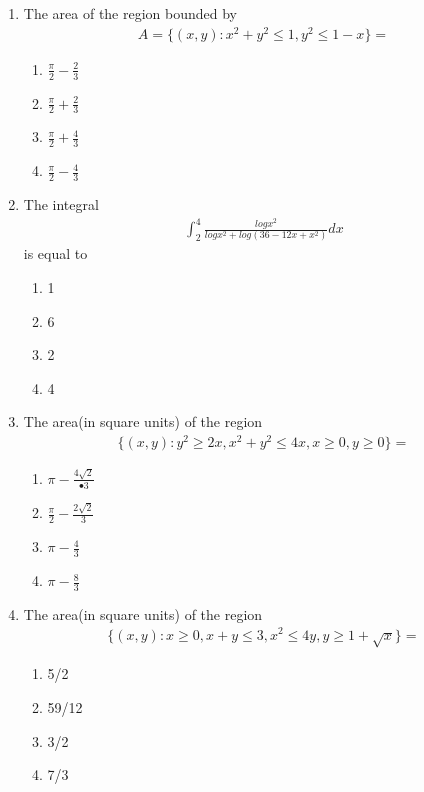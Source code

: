 \begin{enumerate}[label=\arabic*.,ref=\thesubsection.\theenumi]
\item The area of the region bounded by 
\begin{align*}
A = \{(x, y): x^2 + y^2 \leq 1, y^2 \leq 1 - x\} = 
\end{align*} 
\begin{enumerate}
\item $\frac{\pi}{2} - \frac{2}{3}$
\item $\frac{\pi}{2} + \frac{2}{3}$
\item $\frac{\pi}{2} + \frac{4}{3}$
\item $\frac{\pi}{2} - \frac{4}{3}$
\end{enumerate}

\item The integral
\begin{align*}
\int_{2}^{4}\frac{log x^2}{log x^2 + log(36 - 12x + x^2)}dx
\end{align*}
is equal to
\begin{enumerate}
\item 1
\item 6
\item 2
\item 4
\end{enumerate}

\item The area(in square units) of the region
\begin{align*}
\{(x, y): y^2 \geq 2x, x^2 + y^2 \leq 4x, x \geq 0, y \geq 0\} = 
\end{align*}
\begin{enumerate}
\item $\pi - \frac{4\sqrt{2}}{•3}$
\item $\frac{\pi}{2} - \frac{2\sqrt{2}}{3}$
\item $\pi - \frac{4}{3}$
\item $\pi - \frac{8}{3}$
\end{enumerate}

\item The area(in square units) of the region
\begin{align*}
\{(x, y): x \geq 0, x + y \leq 3, x^2 \leq 4y, y \geq 1 + \sqrt{x}\} = 
\end{align*}
\begin{enumerate}
\item 5/2
\item 59/12
\item 3/2
\item 7/3
\end{enumerate}


\end{enumerate}

